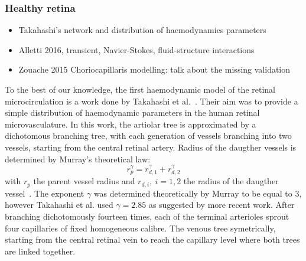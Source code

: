 \documentclass[12pt,a4paper]{article}
\begin{document}
\subsubsection{Healthy retina}
\begin{itemize}
\item Takahashi's network and distribution of haemodynamics parameters
\item Alletti 2016, transient, Navier-Stokes, fluid-structure interactions
\item Zouache 2015 Choriocapillaris modelling: talk about the missing validation
\end{itemize}

To the best of our knowledge, the first haemodynamic model of the retinal microcirculation is a work done by Takahashi et al.~\cite{Takahashi_2009}.
Their aim was to provide a simple distribution of haemodynamic parameters in the human retinal microvasculature.
In this work, the artiolar tree is approximated by a dichotomous branching tree, with each generation of vessels branching into two vessels, starting from the central retinal artery.
Radius of the daugther vessels is determined by Murray's theoretical law:
\begin{equation}
  \label{eq:MurrayLaw}
  r_p^\gamma = r_{d,1}^\gamma + r_{d,2}^\gamma
\end{equation}
with $r_p$ the parent vessel radius and $r_{d,i},~i=1,2$ the radius of the daugther vessel~\cite{Murray_1926}.
The exponent $\gamma$ was determined theoretically by Murray to be equal to $3$, however Takahashi et al. used $\gamma=2.85$ as suggested by more recent work.
After branching dichotomously fourteen times, each of the terminal arterioles sprout four capillaries of fixed homogeneous calibre. 
The venous tree symetrically, starting from the central retinal vein to reach the capillary level where both trees are linked together.
\end{document}
